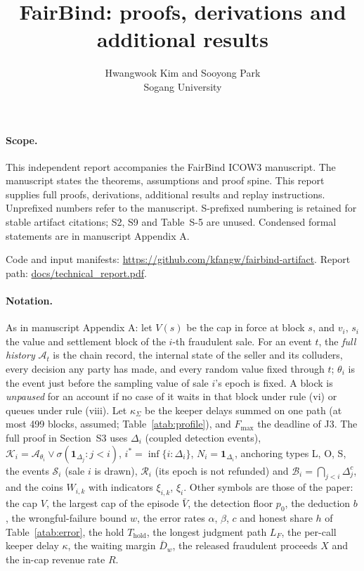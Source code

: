 \documentclass[10pt,a4paper]{article}
\title{FairBind: proofs, derivations and additional results}
\author{Hwangwook Kim and Sooyong Park\\ Sogang University}
\date{}
\newcommand{\Thold}{T_{\mathrm{hold}}}
\newcommand{\Fmax}{F_{\max}}
\newcommand{\kS}{\kappa_{\Sigma}}
\newcommand{\Dw}{\bar D_w}
\newcommand{\ist}{i^{*}}
\newcommand{\cA}{\mathcal{A}}
\newcommand{\cK}{\mathcal{K}}
\newcommand{\cR}{\mathcal{R}}
\newcommand{\cS}{\mathcal{S}}
\newcommand{\cB}{\mathcal{B}}
\newcommand{\one}{\mathbf{1}}
\theoremstyle{plain}
\theoremstyle{remark}
\begin{document}
\maketitle


{\raggedright
\paragraph{Scope.} This independent report accompanies the FairBind ICOW3 manuscript. The manuscript states the theorems, assumptions and proof spine. This report supplies full proofs, derivations, additional results and replay instructions. Unprefixed numbers refer to the manuscript. S-prefixed numbering is retained for stable artifact citations; S2, S9 and Table~S-5 are unused. Condensed formal statements are in manuscript Appendix A.

Code and input manifests: \url{https://github.com/kfangw/fairbind-artifact}. Report path: \url{docs/technical_report.pdf}.\par}

\paragraph{Notation.} As in manuscript Appendix A: let $V(s)$ be the cap in force at block $s$, and $v_i$, $s_i$ the value and settlement block of the $i$-th fraudulent sale. For an event $t$, the \emph{full history} $\cA_t$ is the chain record, the internal state of the seller and its colluders, every decision any party has made, and every random value fixed through $t$; $\theta_i$ is the event just before the sampling value of sale $i$'s epoch is fixed. A block is \emph{unpaused} for an account if no case of it waits in that block under rule (vi) or queues under rule (viii). Let $\kS$ be the keeper delays summed on one path (at most 499 blocks, assumed; Table~\ref{atab:profile}), and $\Fmax$ the deadline of J3. The full proof in Section~S3 uses $\Delta_i$ (coupled detection events), $\cK_i=\cA_{\theta_i}\vee\sigma(\one_{\Delta_j}:j<i)$, $\ist=\inf\{i:\Delta_i\}$, $N_i=\one_{\Delta_i}$, anchoring types L, O, S, the events $\cS_i$ (sale $i$ is drawn), $\cR_i$ (its epoch is not refunded) and $\cB_i=\bigcap_{j<i}\Delta_j^c$, and the coins $W_{i,k}$ with indicators $\xi_{i,k}$, $\xi_i$. Other symbols are those of the paper: the cap $V$, the largest cap of the episode $\bar V$, the detection floor $p_0$, the deduction $b$, the wrongful-failure bound $w$, the error rates $\alpha$, $\beta$, $c$ and honest share $h$ of Table~\ref{atab:error}, the hold $\Thold$, the longest judgment path $L_F$, the per-call keeper delay $\kappa$, the waiting margin $\Dw$, the released fraudulent proceeds $X$ and the in-cap revenue rate $R$.
\end{document}
